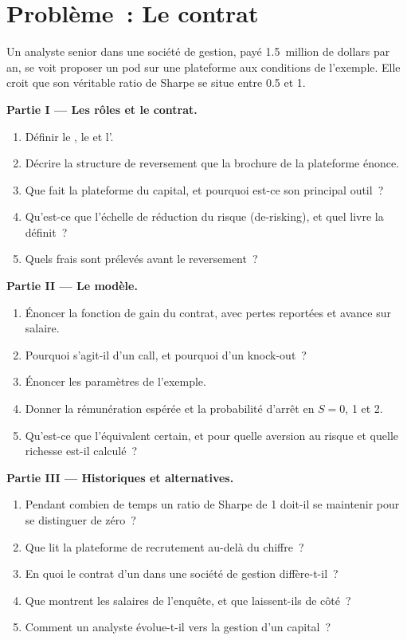 \section{Problème~: Le contrat}

\begin{problem}\label{pb:in:portfolio-manager-and-pod-analyst:1}
Un analyste senior dans une société de gestion, payé 1.5~million de dollars par an, se voit proposer un pod sur une plateforme aux conditions de l'exemple.
Elle croit que son véritable ratio de Sharpe se situe entre 0.5 et 1.

\medskip\noindent\textbf{Partie I --- Les rôles et le contrat.}
\begin{enumerate}
\item Définir le , le  et l'.
\item Décrire la structure de reversement que la brochure de la plateforme énonce.
\item Que fait la plateforme du capital, et pourquoi est-ce son principal outil~?
\item Qu'est-ce que l'échelle de réduction du risque (de-risking), et quel livre la définit~?
\item Quels frais sont prélevés avant le reversement~?
\end{enumerate}

\medskip\noindent\textbf{Partie II --- Le modèle.}
\begin{enumerate}[resume]
\item Énoncer la fonction de gain du contrat, avec pertes reportées et avance sur salaire.
\item Pourquoi s'agit-il d'un call, et pourquoi d'un knock-out~?
\item Énoncer les paramètres de l'exemple.
\item Donner la rémunération espérée et la probabilité d'arrêt en $S=0$, 1 et 2.
\item Qu'est-ce que l'équivalent certain, et pour quelle aversion au risque et quelle richesse est-il calculé~?
\end{enumerate}

\medskip\noindent\textbf{Partie III --- Historiques et alternatives.}
\begin{enumerate}[resume]
\item Pendant combien de temps un ratio de Sharpe de 1 doit-il se maintenir pour se distinguer de zéro~?
\item Que lit la plateforme de recrutement au-delà du chiffre~?
\item En quoi le contrat d'un  dans une société de gestion diffère-t-il~?
\item Que montrent les salaires de l'enquête, et que laissent-ils de côté~?
\item Comment un analyste évolue-t-il vers la gestion d'un capital~?
\end{enumerate}


\end{problem}
